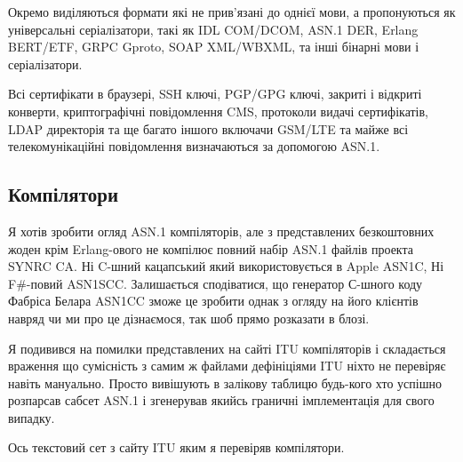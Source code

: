Окремо виділяються формати які не прив'язані до однієї мови, а пропонуються як універсальні серіалізатори, такі як IDL COM/DCOM, ASN.1 DER, Erlang BERT/ETF, GRPC Gproto, SOAP XML/WBXML, та інші бінарні мови і серіалізатори.

Всі сертифікати в браузері, SSH ключі, PGP/GPG ключі, закриті і відкриті конверти, криптографічні повідомлення CMS, протоколи видачі сертифікатів, LDAP директорія та ще багато іншого включачи GSM/LTE та майже всі телекомунікаційні повідомлення визначаються за допомогою ASN.1.

\subsection{Компілятори}

Я хотів зробити огляд ASN.1 компіляторів, але з представлених безкоштовних жоден крім Erlang-ового не компілює повний набір ASN.1 файлів проекта SYNRC CA. Ні C-шний кацапський який використовується в Apple ASN1C, Ні F#-повий ASN1SCC. Залишається сподіватися, що генератор С-шного коду Фабріса Белара ASN1CC зможе це зробити однак з огляду на його клієнтів навряд чи ми про це дізнаємося, так шоб прямо розказати в блозі.

Я подивився на помилки представлених на сайті ITU компіляторів і складається враження що сумісність з самим ж файлами дефініціями ITU ніхто не перевіряє навіть мануально. Просто вивішують в залікову таблицю будь-кого хто успішно розпарсав сабсет ASN.1 і згенерував якийсь граничні імплементація для свого випадку.


Ось текстовий сет з сайту ITU яким я перевіряв компілятори.

\renewcommand{\footnotesize}{\tiny}


